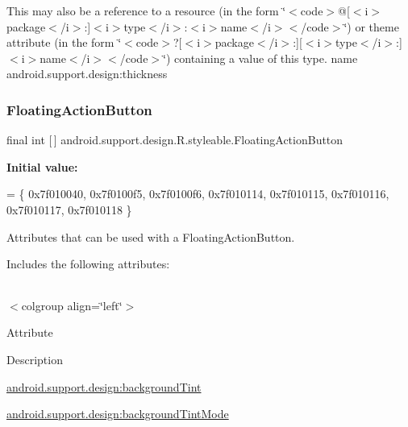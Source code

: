 This may also be a reference to a resource (in the form \char`\"{}$<$code$>$@\mbox{[}$<$i$>$package$<$/i$>$\+:\mbox{]}$<$i$>$type$<$/i$>$\+:$<$i$>$name$<$/i$>$$<$/code$>$\char`\"{}) or theme attribute (in the form \char`\"{}$<$code$>$?\mbox{[}$<$i$>$package$<$/i$>$\+:\mbox{]}\mbox{[}$<$i$>$type$<$/i$>$\+:\mbox{]}$<$i$>$name$<$/i$>$$<$/code$>$\char`\"{}) containing a value of this type.  name android.\+support.\+design\+:thickness \mbox{\label{classandroid_1_1support_1_1design_1_1R_1_1styleable_ac39eabec239d50ec950ae5f013825830}} 
\subsubsection{\texorpdfstring{Floating\+Action\+Button}{FloatingActionButton}}
{\footnotesize\ttfamily final int \mbox{[}$\,$\mbox{]} android.\+support.\+design.\+R.\+styleable.\+Floating\+Action\+Button\hspace{0.3cm}{\ttfamily [static]}}

{\bfseries Initial value\+:}
\begin{DoxyCode}
= \{
            0x7f010040, 0x7f0100f5, 0x7f0100f6, 0x7f010114,
            0x7f010115, 0x7f010116, 0x7f010117, 0x7f010118
        \}
\end{DoxyCode}
Attributes that can be used with a Floating\+Action\+Button. 

Includes the following attributes\+:

\tabulinesep=1mm
\begin{longtabu} spread 0pt [c]{*{0}{|X[-1]}|}
\hline
\end{longtabu}
$<$colgroup align=\char`\"{}left\char`\"{}$>$ 

Attribute

Description 

{\ttfamily \hyperlink{classandroid_1_1support_1_1design_1_1R_1_1styleable_af846797719110f77a09a57d36bf4e5e2}{android.\+support.\+design\+:background\+Tint}}

{\ttfamily \hyperlink{classandroid_1_1support_1_1design_1_1R_1_1styleable_a08b1b04544782c7a364e8aa475e6ad5e}{android.\+support.\+design\+:background\+Tint\+Mode}}

